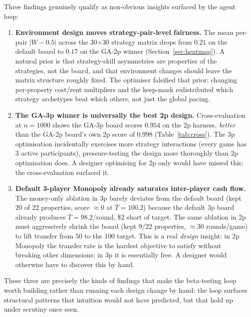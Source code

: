 \documentclass[10pt]{article}
\begin{document}
Three findings genuinely qualify as non-obvious insights surfaced by
the agent loop:

\begin{enumerate}[leftmargin=1.2em,itemsep=2pt]
\item \textbf{Environment design moves strategy-pair-level fairness.}
The mean per-pair $|W{-}0.5|$ across the 30$\times$30 strategy matrix
drops from $0.21$ on the default board to $0.17$ on the GA-2p winner
(Section~\ref{sec:heatmap}). A natural prior is that strategy-skill
asymmetries are properties of the strategies, not the board, and that
environment changes should leave the matrix structure roughly fixed.
The optimiser falsified that prior: changing per-property cost/rent
multipliers and the keep-mask redistributed which strategy archetypes
beat which others, not just the global pacing.

\item \textbf{The GA-3p winner is universally the best 2p design.}
Cross-evaluation at $n{=}1000$ shows the GA-3p board scores $0.954$ on
the 2p harness, \emph{better} than the GA-2p board's own 2p score of
$0.998$ (Table~\ref{tab:cross}). The 3p optimisation incidentally
exercises more strategy interactions (every game has 3 active
participants), pressure-testing the design more thoroughly than 2p
optimisation does. A designer optimising for 2p only would have missed
this; the cross-evaluation surfaced it.

\item \textbf{Default 3-player Monopoly already saturates inter-player
cash flow.} The money-only ablation in 3p barely deviates from the
default board (kept $20$ of $22$ properties, score $\approx 0$ at
$\overline{T}=100.2$) because the default 3p board already produces
$\overline{T}=98.2$/round, $\$2$ short of target. The same ablation in
2p must aggressively shrink the board (kept 9/22 properties, $\approx 30$
rounds/game) to lift transfer from $50$ to the $100$ target. This is a
real \emph{design} insight: in 2p Monopoly the transfer rate is the
hardest objective to satisfy without breaking other dimensions; in 3p
it is essentially free. A designer would otherwise have to discover
this by hand.
\end{enumerate}

These three are precisely the kinds of findings that make the
beta-testing loop worth building rather than running each design change
by hand: the loop surfaces structural patterns that intuition would not
have predicted, but that hold up under scrutiny once seen.
\end{document}
